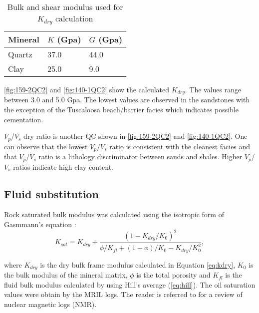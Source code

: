 \begin{table}[h!]
\caption{ Bulk and shear modulus used for $K_{dry}$ calculation \label{tab:moduli}}
\begin{center}
\begin{tabular}{ | l | l |l|}
\hline
Mineral      & $K$ (Gpa) & $G$ (Gpa)  \\
\hline
Quartz & 37.0 & 44.0 \\
\hline
Clay & 25.0 &9.0 \\
\hline
\end{tabular}
\end{center}
\end{table}


\ref{fig:159-2QC2} and \ref{fig:140-1QC2} show the calculated $K_{dry}$. The values
range between 3.0 and 5.0 Gpa. The lowest values are observed in the sandstones
with the exception of the Tuscaloosa beach/barrier facies which indicates
 possible cementation.



$V_{p}$/$V_{s}$ dry ratio is another QC shown in \ref{fig:159-2QC2} and \ref{fig:140-1QC2}. One can observe that the 
lowest $V_{p}$/$V_{s}$ ratio is consistent with the cleanest facies and that  
$V_{p}$/$V_{s}$ ratio is a lithology discriminator between sands and shales. Higher 
$V_{p}$/$V_{s}$ ratios indicate high clay content. 

\newpage
\subsection{Fluid substitution}

Rock saturated bulk modulus was calculated using the isotropic form of Gasmmann's equation 
\citep{ref:gasmmann}:
\begin{equation}
K_{sat}= K_{dry}+\frac{(1-K_{dry}/K_{0})^{2}}{\phi/K_{fl}+(1-\phi)/K_{0}-K_{dry}/K_{0}^2},
  \label{eq:gasmmann}
\end{equation}

where $K_{dry}$ is the dry bulk frame modulus calculated in Equation \ref{eq:kdry}, $K_{0}$ 
is the bulk modulus of the mineral matrix, $\phi$ is the total porosity and $K_{fl}$ is 
the fluid bulk modulus calculated by using Hill's average (\ref{eq:hill}). The oil saturation
values were obtain by the MRIL logs. The reader is referred to \cite{ref:george} for
a review of nuclear magnetic logs (NMR).

